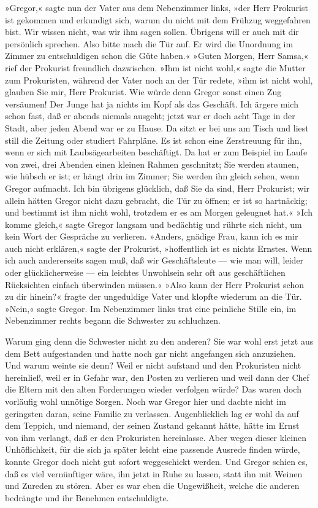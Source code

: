 »Gregor,« sagte nun der Vater aus dem Nebenzimmer links, »der Herr
Prokurist ist gekommen und erkundigt sich, warum du nicht mit dem
Frühzug weggefahren bist. Wir wissen nicht, was wir ihm sagen sollen.
Übrigens will er auch mit dir persönlich sprechen. Also bitte mach die
Tür auf. Er wird die Unordnung im Zimmer zu entschuldigen schon die Güte
haben.« »Guten Morgen, Herr Samsa,« rief der Prokurist freundlich
dazwischen. »Ihm ist nicht wohl,« sagte die Mutter zum Prokuristen,
während der Vater noch an der Tür redete, »ihm ist nicht wohl, glauben
Sie mir, Herr Prokurist. Wie würde denn Gregor sonst einen Zug
versäumen! Der Junge hat ja nichts im Kopf als das Geschäft. Ich ärgere
mich schon fast, daß er abends niemals ausgeht; jetzt war er doch acht
Tage in der Stadt, aber jeden Abend war er zu Hause. Da sitzt er bei uns
am Tisch und liest still die Zeitung oder studiert Fahrpläne. Es ist
schon eine Zerstreuung für ihn, wenn er sich mit Laubsägearbeiten
beschäftigt. Da hat er zum Beispiel im Laufe von zwei, drei Abenden
einen kleinen Rahmen geschnitzt; Sie werden staunen, wie hübsch er ist;
er hängt drin im Zimmer; Sie werden ihn gleich sehen, wenn Gregor
aufmacht. Ich bin übrigens glücklich, daß Sie da sind, Herr Prokurist;
wir allein hätten Gregor nicht dazu gebracht, die Tür zu öffnen; er ist
so hartnäckig; und bestimmt ist ihm nicht wohl, trotzdem er es am Morgen
geleugnet hat.« »Ich komme gleich,« sagte Gregor langsam und bedächtig
und rührte sich nicht, um kein Wort der Gespräche zu verlieren. »Anders,
gnädige Frau, kann ich es mir auch nicht erklären,« sagte der Prokurist,
»hoffentlich ist es nichts Ernstes. Wenn ich auch andererseits sagen
muß, daß wir Geschäftsleute --- wie man will, leider oder
glücklicherweise --- ein leichtes Unwohlsein sehr oft aus geschäftlichen
Rücksichten einfach überwinden müssen.« »Also kann der Herr Prokurist
schon zu dir hinein?« fragte der ungeduldige Vater und klopfte wiederum
an die Tür. »Nein,« sagte Gregor. Im Nebenzimmer links trat eine
peinliche Stille ein, im Nebenzimmer rechts begann die Schwester zu
schluchzen.

Warum ging denn die Schwester nicht zu den anderen? Sie war wohl erst
jetzt aus dem Bett aufgestanden und hatte noch gar nicht angefangen sich
anzuziehen. Und warum weinte sie denn? Weil er nicht aufstand und den
Prokuristen nicht hereinließ, weil er in Gefahr war, den Posten zu
verlieren und weil dann der Chef die Eltern mit den alten Forderungen
wieder verfolgen würde? Das waren doch vorläufig wohl unnötige Sorgen.
Noch war Gregor hier und dachte nicht im geringsten daran, seine Familie
zu verlassen. Augenblicklich lag er wohl da auf dem Teppich, und
niemand, der seinen Zustand gekannt hätte, hätte im Ernst von ihm
verlangt, daß er den Prokuristen hereinlasse. Aber wegen dieser kleinen
Unhöflichkeit, für die sich ja später leicht eine passende Ausrede
finden würde, konnte Gregor doch nicht gut sofort weggeschickt werden.
Und Gregor schien es, daß es viel vernünftiger wäre, ihn jetzt in Ruhe
zu lassen, statt ihn mit Weinen und Zureden zu stören. Aber es war eben
die Ungewißheit, welche die anderen bedrängte und ihr Benehmen
entschuldigte.

